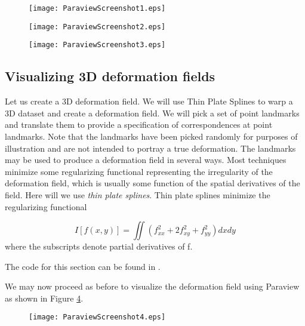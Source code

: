 \begin{figure}
\center
\texttt{[image: ParaviewScreenshot1.eps]}
\label{fig:ParaviewScreenshot1}
\end{figure}

\begin{figure}
\center
\texttt{[image: ParaviewScreenshot2.eps]}
\label{fig:ParaviewScreenshot2}
\end{figure}

\begin{figure}
\center
\texttt{[image: ParaviewScreenshot3.eps]}
\label{fig:ParaviewScreenshot3}
\end{figure}



\subsection{Visualizing 3D deformation fields}
Let us create a 3D deformation field. We will use Thin Plate Splines to warp a 3D dataset and create a deformation field. We will pick a set of point landmarks and translate them to provide a specification of correspondences at point landmarks. Note that the landmarks have been picked randomly for purposes of illustration and are not intended to portray a true deformation. The landmarks may be used to produce a deformation field in several ways. Most techniques minimize some regularizing functional representing the irregularity of the deformation field, which is usually some function of the spatial derivatives of the field. Here will we use {\it thin plate splines}. Thin plate splines minimize the regularizing functional

\begin{equation}
I[f(x,y)] = \iint (f^2_{xx} + 2 f^2_{xy} + f^2_{yy}) dx dy
\end{equation}
where the subscripts denote partial derivatives of f.

The code for this section can be found in .

We may now proceed as before to visualize the deformation field using Paraview as shown in Figure \ref{fig:ParaviewScreenshot4}.

\begin{figure}
\center
\texttt{[image: ParaviewScreenshot4.eps]}
\label{fig:ParaviewScreenshot4}
\end{figure}



